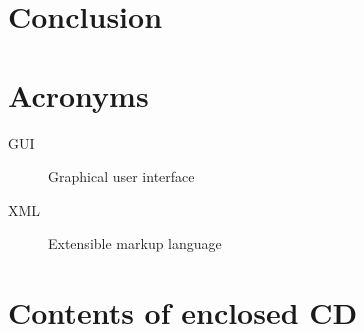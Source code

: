 \documentclass[thesis=M,english]{FITthesis}[2011/07/15]
\begin{document}
\chapter{Conclusion}





\appendix

\chapter{Acronyms}
\begin{description}
	\item[GUI] Graphical user interface
	\item[XML] Extensible markup language
\end{description}


\chapter{Contents of enclosed CD}
\end{document}
